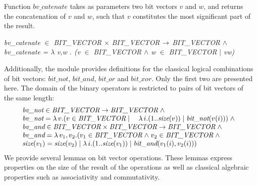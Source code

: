 \documentclass[a4paper]{llncs}
\begin{document}
Function $bv\_catenate$ takes as parameters two bit vectors $v$ and
$w$, and returns the concatenation of $v$ and $w$, such
that $v$ constitutes the most significant part of the result.




\hspace*{0.00in} \it bv\_catenate  $\in$  \it BIT\_VECTOR  $\times$  \it BIT\_VECTOR  $\rightarrow$ \it
BIT\_VECTOR $\land$\\
\hspace*{0.21in} \it bv\_catenate \rm =  $\lambda$  v\rm ,\it w \rm . \rm (\it v 
$\in$  \it BIT\_VECTOR $\land$ \it w $\in$  \it BIT\_VECTOR  $\mid$  \it v\^ \it w\rm ) %

%
%


Additionally, the module provides definitions for the classical
logical combinations of bit vectors: $\textit{bit\_not}$,
$\textit{bit\_and}$, $\textit{bit\_or}$ and $\textit{bit\_xor}$. Only
the first two are presented here. The domain of the binary operators
is restricted to pairs of bit vectors of the same length:
$$
\begin{array}{l}
\textit{bv\_not} \in \textit{BIT\_VECTOR} \fun \textit{BIT\_VECTOR} \land \\
\textit{bv\_not} = \lambda v . (v \in \textit{BIT\_VECTOR} \mid \quad \lambda i . (1 .. \textit{size}(v)) \mid \textit{bit\_not}(v(i))) \land \\
\textit{bv\_and} \in \textit{BIT\_VECTOR} \times \textit{BIT\_VECTOR} \fun \textit{BIT\_VECTOR} \land \\
\textit{bv\_and} = \lambda v_1, v_2 . (v_1 \in \textit{BIT\_VECTOR} \land v_2 \in \textit{BIT\_VECTOR} \land \\
\textit{size}(v_1) = \textit{size}(v_2) \mid \lambda i . (1 .. \textit{size}(v_1)) \mid
\textit{bit\_and}(v_1(i), v_2(i)))
\end{array}
$$
We provide several lemmas on bit vector operations. These lemmas
express properties on the size of the result of the operations
as well as classical algebraic properties such as associativity
and commutativity.
\end{document}

